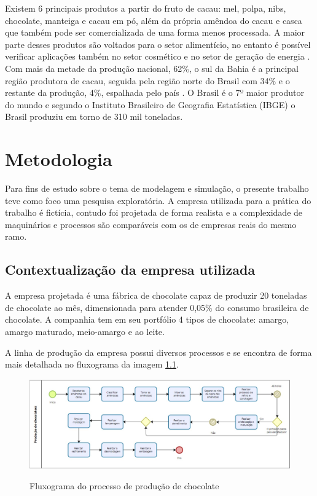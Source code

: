 \documentclass[
	12pt,				%
	openright,			%
	oneside,			%
	a4paper,			%
	english,			%
	french,				%
	spanish,			%
	brazil				%
	]{abntex2}
\begin{document}
Existem 6 principais produtos a partir do fruto de cacau: mel, polpa, nibs, chocolate, manteiga e cacau em pó, além da própria amêndoa do cacau e casca que também pode ser comercializada de uma forma menos processada. A maior parte desses produtos são voltados para o setor alimentício, no entanto é possível verificar aplicações também no setor cosmético e no setor de geração de energia \cite{hansen}. Com mais da metade da produção nacional, 62$\%$, o sul da Bahia é a principal região produtora de cacau, seguida pela região norte do Brasil com 34$\%$ e o restante da produção, 4$\%$, espalhada pelo país \cite{senar}. O Brasil é o 7º maior produtor do mundo e segundo o Instituto Brasileiro de Geografia Estatística (IBGE) o Brasil produziu em torno de 310 mil toneladas. \cite{Icco} 


\chapter{Metodologia}

Para fins de estudo sobre o tema de modelagem e simulação, o presente trabalho teve como foco uma pesquisa exploratória. A empresa utilizada para a prática do trabalho é fictícia, contudo foi projetada de forma realista e a complexidade de maquinários e processos são comparáveis com os de empresas reais do mesmo ramo. 

\section{Contextualização da empresa utilizada}

A empresa projetada é uma fábrica de chocolate capaz de produzir 20 toneladas de chocolate ao mês, dimensionada para atender 0,05$\%$ do consumo brasileira de chocolate. A companhia tem em seu portfólio 4 tipos de chocolate: amargo, amargo maturado, meio-amargo e ao leite. 

A linha de produção da empresa possui diversos processos e se encontra de forma mais detalhada no fluxograma da imagem \ref{fluxocacau}.


\begin{figure}[H]
\begin{center}
\caption{Fluxograma do processo de produção de chocolate}
\includegraphics[scale=0.34]{../../Pictures/fluxo1.jpeg} 
\label{fluxocacau}
\end{center}
\end{figure}
\end{document}
